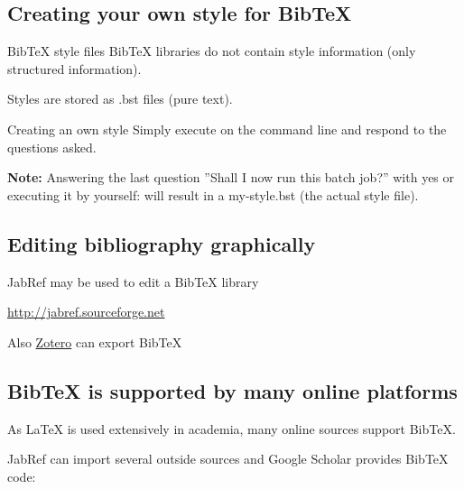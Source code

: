 \subsection{Creating your own style for {Bib\TeX}}
\begin{frame}
	\begin{block}{Bib{\TeX} style files}
		{Bib\TeX} libraries do not contain style information (only structured
		information). 

		Styles are stored as {\color{code}.bst} files (pure text).
	\end{block}

	\begin{block}{Creating an own style}
		Simply execute  on the command line and respond to
		the questions asked.

		\textbf{Note:} Answering the last question ''Shall I now run this batch
		job?'' with yes or executing it by yourself:
		will result in a {\color{red}my-style.bst} (the actual style file).
	\end{block}

\end{frame}

\subsection{Editing bibliography graphically}
\begin{frame}
	JabRef may be used to edit a {Bib\TeX} library
	\begin{center}

		\url{http://jabref.sourceforge.net}
	\end{center}	
\end{frame}


\begin{frame}
	Also \href{http://www.zotero.org}{Zotero} can export {Bib\TeX}
	\begin{center}
	\end{center}
\end{frame}

\subsection{Bib{\TeX} is supported by many online platforms}
\begin{frame}
	As {\LaTeX} is used extensively in academia, many online sources support Bib{\TeX}.
	
	JabRef can import several outside sources and Google Scholar provides Bib{\TeX} code:
		\begin{center}
	\end{center}
\end{frame}
